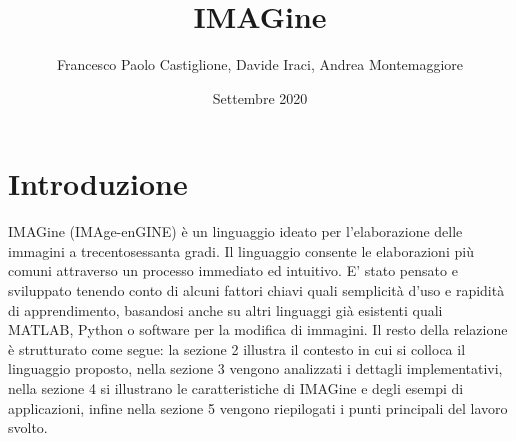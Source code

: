 \documentclass[10pt]{article}
\title{IMAGine}
\author{Francesco Paolo Castiglione, Davide Iraci, Andrea Montemaggiore}
\date{Settembre 2020}
\begin{document}
	\maketitle
	\tableofcontents
	\clearpage

\section{Introduzione}IMAGine (IMAge-enGINE) è un linguaggio ideato per l’elaborazione delle immagini a trecentosessanta gradi. Il linguaggio consente le elaborazioni più comuni attraverso un processo immediato ed intuitivo.
E’ stato pensato e sviluppato tenendo conto di alcuni fattori chiavi quali semplicità d’uso e rapidità di apprendimento, basandosi anche su altri linguaggi già esistenti quali MATLAB, Python o software per la modifica di immagini.\newline
Il resto della relazione è strutturato come segue: la sezione 2 illustra il contesto in cui si colloca il linguaggio proposto, nella sezione 3 vengono analizzati i dettagli implementativi, nella sezione 4 si illustrano le caratteristiche di IMAGine e degli esempi di applicazioni, infine nella sezione 5 vengono riepilogati i punti principali del lavoro svolto.
\clearpage
\end{document}
